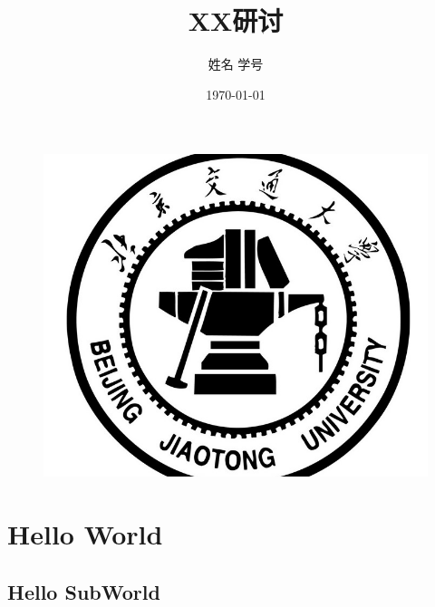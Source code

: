 \documentclass[11pt,a4paper,UTF8]{ctexart}
\title{XX研讨}
\author{姓名 学号}
\date{\today}
\begin{document}
	\begin{figure}
		\centering
		\includegraphics[width=0.7\linewidth]{Pictures/BJTU_logo}
	\end{figure}

	
	\maketitle
	\newpage
	\tableofcontents
	\newpage

	\section{Hello World}	
	\subsection{Hello SubWorld}

	\newpage
\end{document}
